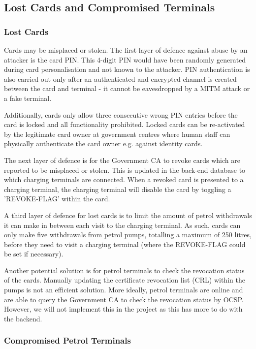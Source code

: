 \documentclass[a4paper,10pt]{llncs}
\begin{document}
\subsection{Lost Cards and Compromised Terminals}
\label{section:lost}
\subsubsection{Lost Cards}
Cards may be misplaced or stolen. The first layer of defence against abuse by an attacker is the card PIN. This 4-digit PIN would have been randomly generated during card personalisation and not known to the attacker. PIN authentication is also carried out only after an authenticated and encrypted channel is created between the card and terminal - it cannot be eavesdropped by a MITM attack or a fake terminal. 

Additionally, cards only allow three consecutive wrong PIN entries before the card is locked and all functionality prohibited. Locked cards can be re-activated by the legitimate card owner at government centres where human staff can physically authenticate the card owner e.g. against identity cards.

The next layer of defence is for the Government CA to revoke cards which are reported to be misplaced or stolen. This is updated in the back-end database to which charging terminals are connected. When a revoked card is presented to a charging terminal, the charging terminal will disable the card by toggling a 'REVOKE-FLAG' within the card.

A third layer of defence for lost cards is to limit the amount of petrol withdrawals it can make in between each visit to the charging terminal. As such, cards can only make five withdrawals from petrol pumps, totalling a maximum of 250 litres, before they need to visit a charging terminal (where the REVOKE-FLAG could be set if necessary).

Another potential solution is for petrol terminals to check the revocation status of the cards. Manually updating the certificate revocation list (CRL) within the pumps is not an efficient solution. More ideally, petrol terminals are online and are able to query the Government CA to check the revocation status by OCSP. However, we will not implement this in the project as this has more to do with the backend.

\subsubsection{Compromised Petrol Terminals}
\end{document}
